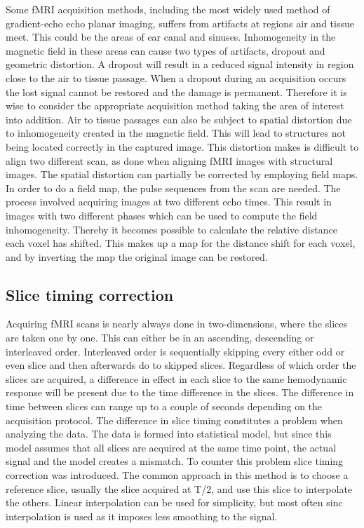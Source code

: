 Some fMRI acquisition methods, including the most widely used method of gradient-echo echo planar imaging, suffers from artifacts at regions air and tissue meet. This could be the areas of ear canal and sinuses. Inhomogeneity in the magnetic field in these areas can cause two types of artifacts, dropout and geometric distortion. A dropout will result in a reduced signal intensity in region close to the air to tissue passage. When a dropout during an acquisition occurs the lost signal cannot be restored and the damage is permanent. Therefore it is wise to consider the appropriate acquisition method taking the area of interest into addition. Air to tissue passages can also be subject to spatial distortion due to inhomogeneity created in the magnetic field. This will lead to structures not being located correctly in the captured image. This distortion makes is difficult to align two different scan, as done when aligning fMRI images with structural images. 
The spatial distortion can partially be corrected by employing field maps. In order to do a field map, the pulse sequences from the scan are needed. The process involved acquiring images at two different echo times. This result in images with two different phases which can be used to compute the field inhomogeneity. Thereby it becomes possible to calculate the relative distance each voxel has shifted. This makes up a map for the distance shift for each voxel, and by inverting the map the original image can be restored.  

\subsection{Slice timing correction}

Acquiring fMRI scans is nearly always done in two-dimensions, where the slices are taken one by one. This can either be in an ascending, descending or interleaved order. Interleaved order  is sequentially skipping every either odd or even slice and then afterwards do to skipped slices. Regardless of which order the slices are acquired, a difference in effect in each slice to the same hemodynamic response will be present due to the time difference in the slices. The difference in time between slices can range up to a couple of seconds depending on the acquisition protocol. 
The difference in slice timing constitutes a problem when analyzing the data. The data is formed into statistical model, but since this model assumes that all slices are acquired at the same time point, the actual signal and the model creates a mismatch. To counter this problem slice timing correction was introduced. The common approach in this method is to choose a reference slice, usually the slice acquired at T/2, and use this slice to interpolate the others. Linear interpolation can be used for simplicity, but most often sinc interpolation is used as it imposes less smoothing to the signal. 

